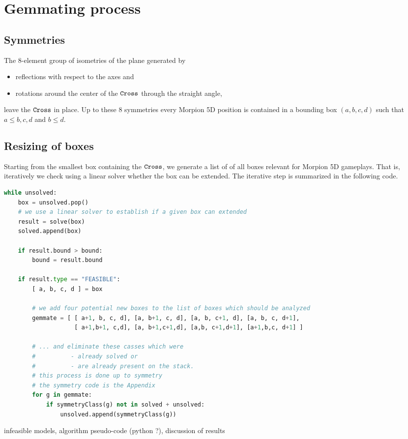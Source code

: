 \section{Gemmating process}
\label{sec:gemmating}

\subsection{Symmetries}
The $8$-element group of isometries of the plane generated by 
\begin{itemize}
\item reflections with respect to the axes and 
\item rotations around the center of the $\texttt{Cross}$ through the straight angle,
\end{itemize}
leave the $\texttt{Cross}$ in place. 
Up to these $8$ symmetries every Morpion 5D position is contained in a bounding box $(a,b,c,d)$ such that
  $a \leq b,c,d$ and $b \leq d$. 

\subsection{Resizing of boxes}
Starting from the smallest box containing the $\texttt{Cross}$, we generate a list of of all boxes relevant for 
Morpion 5D gameplays. That is, iteratively we check using a linear solver whether the box can be extended. 
The iterative step is summarized in the following code.
\begin{lstlisting}[language = Python,
  basicstyle=\ttfamily\scriptsize,keywordstyle=\color{red},backgroundcolor=\color{white}]
while unsolved:
    box = unsolved.pop()
    # we use a linear solver to establish if a given box can extended
    result = solve(box)         
    solved.append(box)

    if result.bound > bound:
        bound = result.bound
        
    if result.type == "FEASIBLE":
        [ a, b, c, d ] = box

        # we add four potential new boxes to the list of boxes which should be analyzed
        gemmate = [ [ a+1, b, c, d], [a, b+1, c, d], [a, b, c+1, d], [a, b, c, d+1],
                    [ a+1,b+1, c,d], [a, b+1,c+1,d], [a,b, c+1,d+1], [a+1,b,c, d+1] ]
        
        # ... and eliminate these casses which were 
        #          - already solved or 
        #          - are already present on the stack.
        # this process is done up to symmetry 
        # the symmetry code is the Appendix             
        for g in gemmate:
            if symmetryClass(g) not in solved + unsolved:
                unsolved.append(symmetryClass(g))
\end{lstlisting}

  infeasible models, 
  algorithm pseudo-code (python ?),
  discussion of results


